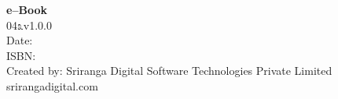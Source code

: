 \thispagestyle{empty}

 \textbf{e–Book}\\
 04೩v1.0.0\\
 Date: \\
 ISBN: \\
 Created by: Sriranga Digital Software Technologies Private Limited\\srirangadigital.com

